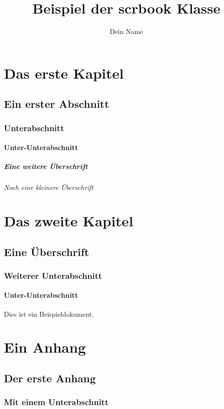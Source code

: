 \documentclass[pdftex,a4paper]{scrbook}
\title{Beispiel der scrbook Klasse}
\author{Dein Name}
\begin{document}
\maketitle

\tableofcontents

\chapter{Das erste Kapitel}

\section{Ein erster Abschnitt}

\subsection{Unterabschnitt}

\subsubsection{Unter-Unterabschnitt}

\paragraph{Eine weitere Überschrift}

\subparagraph{Noch eine kleinere Überschrift}

\chapter{Das zweite Kapitel}

\section{Eine Überschrift}

\subsection{Weiterer Unterabschnitt}

\subsubsection{Unter-Unterabschnitt}

Dies ist ein Beispieldokument.

\appendix

\chapter{Ein Anhang}

\section{Der erste Anhang}

\subsection{Mit einem Unterabschnitt}
\end{document}
